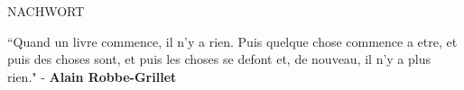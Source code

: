 \documentclass[11pt]{article}
\begin{document}
\begingroup
\begin{center}
\huge NACHWORT
\end{center}
\endgroup

\vspace*{15\baselineskip}

\begingroup
\begin{center}
``Quand un livre commence, il n'y a rien. Puis quelque chose commence a etre, et puis des choses sont, et puis les choses se defont et, de nouveau, il n'y a plus rien."
\rightskip\leftskip
\phantom{text} \hfill - \textbf{Alain Robbe-Grillet}
\end{center}
\endgroup
\end{document}

